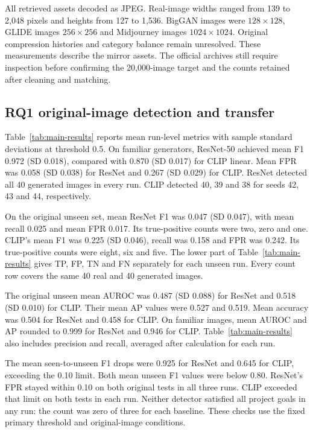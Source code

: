 All retrieved assets decoded as JPEG. Real-image widths ranged from 139 to 2,048 pixels and heights from 127 to 1,536. BigGAN images were $128\times128$, GLIDE images $256\times256$ and Midjourney images $1024\times1024$. Original compression histories and category balance remain unresolved. These measurements describe the mirror assets. The official archives still require inspection before confirming the 20,000-image target and the counts retained after cleaning and matching. 
\FloatBarrier

\subsection{RQ1 original-image detection and transfer}
\label{sec:results-rq1}
Table~\ref{tab:main-results} reports mean run-level metrics with sample standard deviations at threshold 0.5. On familiar generators, ResNet-50 achieved mean F1 0.972 (SD 0.018), compared with 0.870 (SD 0.017) for CLIP linear. Mean FPR was 0.058 (SD 0.038) for ResNet and 0.267 (SD 0.029) for CLIP. ResNet detected all 40 generated images in every run. CLIP detected 40, 39 and 38 for seeds 42, 43 and 44, respectively.



On the original unseen set, mean ResNet F1 was 0.047 (SD 0.047), with mean recall 0.025 and mean FPR 0.017. Its true-positive counts were two, zero and one. CLIP's mean F1 was 0.225 (SD 0.046), recall was 0.158 and FPR was 0.242. Its true-positive counts were eight, six and five. The lower part of Table~\ref{tab:main-results} gives TP, FP, TN and FN separately for each unseen run. Every count row covers the same 40 real and 40 generated images.

The original unseen mean AUROC was 0.487 (SD 0.088) for ResNet and 0.518 (SD 0.010) for CLIP. Their mean AP values were 0.527 and 0.519. Mean accuracy was 0.504 for ResNet and 0.458 for CLIP. On familiar images, mean AUROC and AP rounded to 0.999 for ResNet and 0.946 for CLIP. Table~\ref{tab:main-results} also includes precision and recall, averaged after calculation for each run.

The mean seen-to-unseen F1 drops were 0.925 for ResNet and 0.645 for CLIP, exceeding the 0.10 limit. Both mean unseen F1 values were below 0.80. ResNet's FPR stayed within 0.10 on both original tests in all three runs. CLIP exceeded that limit on both tests in each run. Neither detector satisfied all project goals in any run: the count was zero of three for each baseline. These checks use the fixed primary threshold and original-image conditions.

